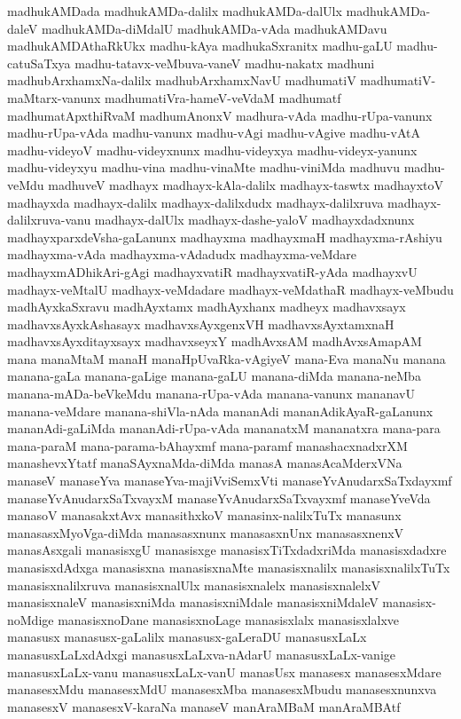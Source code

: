 {madhukAMDada
madhukAMDa-dalilx
madhukAMDa-dalUlx
madhukAMDa-daleV
madhukAMDa-diMdalU
madhukAMDa-vAda
madhukAMDavu
madhukAMDAthaRkUkx
madhu-kAya
madhukaSxranitx
madhu-gaLU
madhu-catuSaTxya
madhu-tatavx-veMbuva-vaneV
madhu-nakatx
madhuni
madhubArxhamxNa-dalilx
madhubArxhamxNavU
madhumatiV
madhumatiV-maMtarx-vanunx
madhumatiVra-hameV-veVdaM
madhumatf
madhumatApxthiRvaM
madhumAnonxV
madhura-vAda
madhu-rUpa-vanunx
madhu-rUpa-vAda
madhu-vanunx
madhu-vAgi
madhu-vAgive
madhu-vAtA
madhu-videyoV
madhu-videyxnunx
madhu-videyxya
madhu-videyx-yanunx
madhu-videyxyu
madhu-vina
madhu-vinaMte
madhu-viniMda
madhuvu
madhu-veMdu
madhuveV
madhayx
madhayx-kAla-dalilx
madhayx-taswtx
madhayxtoV
madhayxda
madhayx-dalilx
madhayx-dalilxdudx
madhayx-dalilxruva
madhayx-dalilxruva-vanu
madhayx-dalUlx
madhayx-dashe-yaloV
madhayxdadxnunx
madhayxparxdeVsha-gaLanunx
madhayxma
madhayxmaH
madhayxma-rAshiyu
madhayxma-vAda
madhayxma-vAdadudx
madhayxma-veMdare
madhayxmADhikAri-gAgi
madhayxvatiR
madhayxvatiR-yAda
madhayxvU
madhayx-veMtalU
madhayx-veMdadare
madhayx-veMdathaR
madhayx-veMbudu
madhAyxkaSxravu
madhAyxtamx
madhAyxhanx
madheyx
madhavxsayx
madhavxsAyxkAshasayx
madhavxsAyxgenxVH
madhavxsAyxtamxnaH
madhavxsAyxditayxsayx
madhavxseyxY
madhAvxsAM
madhAvxsAmapAM
mana
manaMtaM
manaH
manaHpUvaRka-vAgiyeV
mana-Eva
manaNu
manana
manana-gaLa
manana-gaLige
manana-gaLU
manana-diMda
manana-neMba
manana-mADa-beVkeMdu
manana-rUpa-vAda
manana-vanunx
mananavU
manana-veMdare
manana-shiVla-nAda
mananAdi
mananAdikAyaR-gaLanunx
mananAdi-gaLiMda
mananAdi-rUpa-vAda
mananatxM
mananatxra
mana-para
mana-paraM
mana-parama-bAhayxmf
mana-paramf
manashacxnadxrXM
manashevxYtatf
manaSAyxnaMda-diMda
manasA
manasAcaMderxVNa
manaseV
manaseYva
manaseYva-majiVviSemxVti
manaseYvAnudarxSaTxdayxmf
manaseYvAnudarxSaTxvayxM
manaseYvAnudarxSaTxvayxmf
manaseYveVda
manasoV
manasakxtAvx
manasithxkoV
manasinx-nalilxTuTx
manasunx
manasasxMyoVga-diMda
manasasxnunx
manasasxnUnx
manasasxnenxV
manasAsxgali
manasisxgU
manasisxge
manasisxTiTxdadxriMda
manasisxdadxre
manasisxdAdxga
manasisxna
manasisxnaMte
manasisxnalilx
manasisxnalilxTuTx
manasisxnalilxruva
manasisxnalUlx
manasisxnalelx
manasisxnalelxV
manasisxnaleV
manasisxniMda
manasisxniMdale
manasisxniMdaleV
manasisx-noMdige
manasisxnoDane
manasisxnoLage
manasisxlalx
manasisxlalxve
manasusx
manasusx-gaLalilx
manasusx-gaLeraDU
manasusxLaLx
manasusxLaLxdAdxgi
manasusxLaLxva-nAdarU
manasusxLaLx-vanige
manasusxLaLx-vanu
manasusxLaLx-vanU
manasUsx
manasesx
manasesxMdare
manasesxMdu
manasesxMdU
manasesxMba
manasesxMbudu
manasesxnunxva
manasesxV
manasesxV-karaNa
manaseV
manAraMBaM
manAraMBAtf
}
